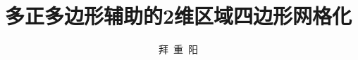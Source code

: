 \documentclass[bachelor,twoside,openright]{ustcthesis}
\title{多正多边形辅助的2维区域四边形网格化}%
\author{拜\ 重\ 阳}
\begin{document}
  \maketitle

\frontmatter
\makeatletter
\ifustc@bachelor
	
	
	\tableofcontents

	\ustclot
	\ustclof
	\ustcloa
	
\else
	\tableofcontents

	
\fi
\makeatother

\mainmatter
  
  
  
  
  
  

\backmatter
\end{document}
